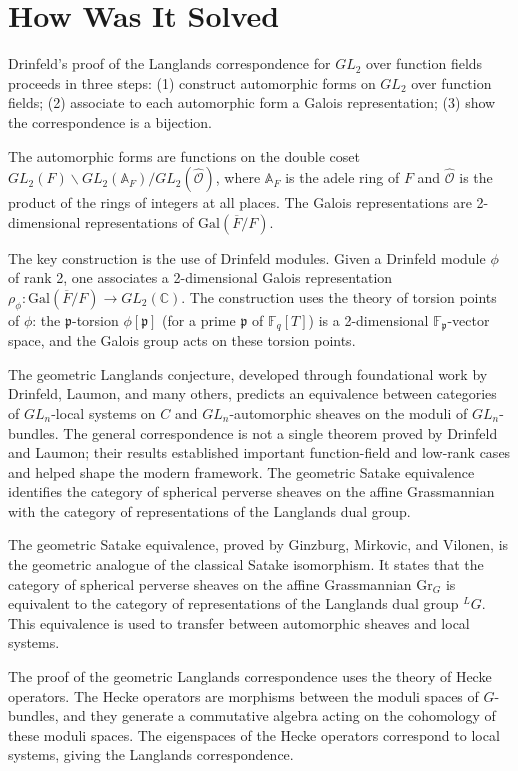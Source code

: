 \section{How Was It Solved}

Drinfeld's proof of the Langlands correspondence for $GL_2$ over function fields proceeds in three steps: (1) construct automorphic forms on $GL_2$ over function fields; (2) associate to each automorphic form a Galois representation; (3) show the correspondence is a bijection.

The automorphic forms are functions on the double coset $GL_2(F) \backslash GL_2(\mathbb{A}_F) / GL_2(\hat{\mathcal{O}})$, where $\mathbb{A}_F$ is the adele ring of $F$ and $\hat{\mathcal{O}}$ is the product of the rings of integers at all places. The Galois representations are 2-dimensional representations of $\text{Gal}(\overline{F}/F)$.

The key construction is the use of Drinfeld modules. Given a Drinfeld module $\phi$ of rank 2, one associates a 2-dimensional Galois representation $\rho_\phi: \text{Gal}(\overline{F}/F) \to GL_2(\mathbb{C})$. The construction uses the theory of torsion points of $\phi$: the $\mathfrak{p}$-torsion $\phi[\mathfrak{p}]$ (for a prime $\mathfrak{p}$ of $\mathbb{F}_q[T]$) is a 2-dimensional $\mathbb{F}_\mathfrak{p}$-vector space, and the Galois group acts on these torsion points.

The geometric Langlands conjecture, developed through foundational work by Drinfeld, Laumon, and many others, predicts an equivalence between categories of $GL_n$-local systems on $C$ and $GL_n$-automorphic sheaves on the moduli of $GL_n$-bundles. The general correspondence is not a single theorem proved by Drinfeld and Laumon; their results established important function-field and low-rank cases and helped shape the modern framework. The geometric Satake equivalence identifies the category of spherical perverse sheaves on the affine Grassmannian with the category of representations of the Langlands dual group.

The geometric Satake equivalence, proved by Ginzburg, Mirkovic, and Vilonen, is the geometric analogue of the classical Satake isomorphism. It states that the category of spherical perverse sheaves on the affine Grassmannian $\text{Gr}_G$ is equivalent to the category of representations of the Langlands dual group ${}^LG$. This equivalence is used to transfer between automorphic sheaves and local systems.

The proof of the geometric Langlands correspondence uses the theory of Hecke operators. The Hecke operators are morphisms between the moduli spaces of $G$-bundles, and they generate a commutative algebra acting on the cohomology of these moduli spaces. The eigenspaces of the Hecke operators correspond to local systems, giving the Langlands correspondence.


